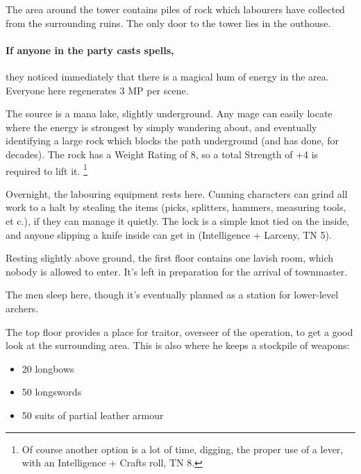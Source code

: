 \begin{multicols}{2}

The area around the tower contains piles of rock which labourers have collected from the surrounding ruins.  The only door to the tower lies in the outhouse.

\paragraph{If anyone in the party casts spells,}
they noticed immediately that there is a magical hum of energy in the area.
Everyone here regenerates 3 MP per scene.

The source is a mana lake, slightly underground.
Any mage can easily locate where the energy is strongest by simply wandering about, and eventually identifying a large rock which blocks the path underground (and has done, for decades).
The rock has a Weight Rating of 8, so a total Strength of +4 is required to lift it.%
\footnote{Of course another option is a lot of time, digging, the proper use of a lever, with an Intelligence + Crafts roll, TN 8.}



Overnight, the labouring equipment rests here.  Cunning characters can grind all work to a halt by stealing the items (picks, splitters, hammers, measuring tools, et c.), if they can manage it quietly.  The lock is a simple knot tied on the inside, and anyone slipping a knife inside can get in (Intelligence + Larceny, TN 5).


Resting slightly above ground, the first floor contains one lavish room, which nobody is allowed to enter.  It's left in preparation for the arrival of \gls{townmaster}.


The men sleep here, though it's eventually planned as a station for lower-level archers.


The top floor provides a place for \gls{traitor}, overseer of the operation, to get a good look at the surrounding area.
This is also where he keeps a stockpile of weapons:

\begin{itemize}

  \item{20 longbows}
  \item{50 longswords}
  \item{50 suits of partial leather armour}


\end{itemize}
\end{multicols}

